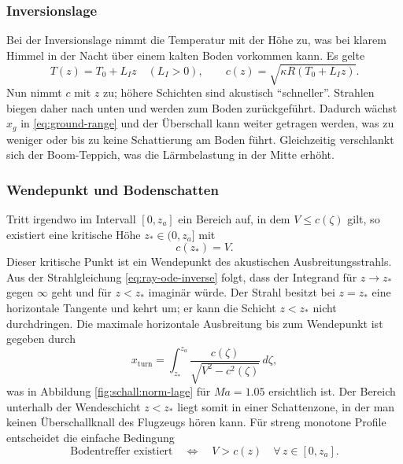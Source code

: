 \subsubsection{Inversionslage}
Bei der Inversionslage nimmt die Temperatur mit der Höhe zu, was bei klarem
Himmel in der Nacht über einem kalten Boden vorkommen kann.
Es gelte
\begin{equation}
    T(z) = T_0 + L_{I} z \quad (L_{I}>0),
    \qquad
    c(z) = \sqrt{\kappa R(T_0 + L_{I} z)} .
    \label{eq:inversion}
\end{equation}
Nun nimmt $c$ mit $z$ zu; höhere Schichten sind akustisch ``schneller''.
Strahlen biegen daher nach unten und werden zum Boden zurückgeführt.
Dadurch wächst $x_g$ in \eqref{eq:ground-range} und der Überschall
kann weiter getragen werden, was zu weniger oder bis zu keine
Schattierung am Boden führt.
Gleichzeitig verschlankt sich der Boom-Teppich, was die
Lärmbelastung in der Mitte erhöht.

\subsubsection{Wendepunkt und Bodenschatten}
Tritt irgendwo im Intervall $[0,z_a]$ ein Bereich auf, in dem
$V\le c(\zeta)$ gilt, so existiert eine
kritische Höhe $z_\ast\in(0,z_a]$ mit
\begin{equation}
    c(z_\ast)=V.
    \label{eq:turning-def}
\end{equation}
Dieser kritische Punkt ist ein Wendepunkt des akustischen Ausbreitungsstrahls.
Aus der Strahlgleichung \eqref{eq:ray-ode-inverse} folgt, dass der
Integrand für $z\to z_\ast$ gegen $\boldsymbol{\infty}$ geht und für $z<z_\ast$ imaginär würde.
Der Strahl besitzt bei $z=z_\ast$ eine horizontale Tangente und kehrt um;
er kann die Schicht $z<z_\ast$ nicht durchdringen.
Die maximale horizontale Ausbreitung bis zum Wendepunkt ist gegeben durch
\begin{equation}
    x_{\mathrm{turn}}
    = \int_{z_\ast}^{z_a} \frac{c(\zeta)}{\sqrt{V^2 - c^2(\zeta)}}\,d\zeta,
    \label{eq:x-turn}
\end{equation}
was in Abbildung \ref{fig:schall:norm-lage} für $\textit{Ma}=1.05$ ersichtlich ist.
Der Bereich unterhalb der Wendeschicht $z<z_\ast$ liegt somit in einer
Schattenzone, in der man keinen Überschallknall des Flugzeugs hören kann.
Für streng monotone Profile entscheidet die einfache Bedingung
\begin{equation}
    \text{Bodentreffer existiert} \quad\Leftrightarrow\quad V>c(z)\quad\forall\,z\in[0,z_a].
    \label{eq:ground-hit-condition}
\end{equation}

